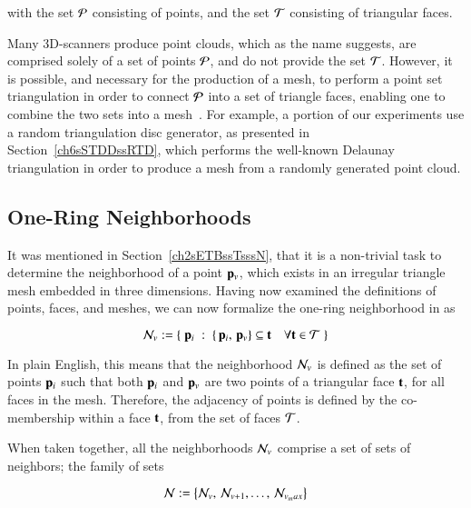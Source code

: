 with the set $\mathcal{P}$ consisting of points, and the set $\mathcal{T}$ consisting of triangular faces.

Many 3D-scanners produce point clouds, which as the name suggests, are comprised solely of a set of points $\mathcal{P}$, and do not provide the set $\mathcal{T}$. However, it is possible, and necessary for the production of a mesh, to perform a point set triangulation in order to connect $\mathcal{P}$ into a set of triangle faces, enabling one to combine the two sets into a mesh~\cite[p.~26]{Mara12}. For example, a portion of our experiments use a random triangulation disc generator, as presented in Section~\ref{ch6sSTDDssRTD}, which performs the well-known Delaunay triangulation in order to produce a mesh from a randomly generated point cloud.

%
%
%
%
\subsection{One-Ring Neighborhoods}
\label{ch2sTDDssORN}
It was mentioned in Section~\ref{ch2sETBssTsssN}, that it is a non-trivial task to determine the neighborhood of a point $\mathbf{p}_v$, which exists in an irregular triangle mesh embedded in three dimensions. Having now examined the definitions of points, faces, and meshes, we can now formalize the one-ring neighborhood in \tdd{} as

\begin{equation}
	\mathcal{N}_v := \left \{\;\mathbf{p}_i\;:\;\left \{\,\mathbf{p}_i,\,\mathbf{p}_v\right \} \subseteq \mathbf{t} \quad \forall \mathbf{t} \in \mathcal{T}\;\right \}
	\label{eq:defineNeighborhood}
\end{equation}%
%
%

In plain English, this means that the neighborhood $\mathcal{N}_v$ is defined as the set of points $\mathbf{p}_i$ such that both $\mathbf{p}_i$ and $\mathbf{p}_v$ are two points of a triangular face $\mathbf{t}$, for all faces in the mesh. Therefore, the adjacency of points is defined by the co-membership within a face $\mathbf{t}$, from the set of faces $\mathcal{T}$.

When taken together, all the neighborhoods $\mathcal{N}_v$ comprise a set of sets of neighbors; the family of sets

\begin{equation}
	\mathcal{N} := \left \{\mathcal{N}_v,\,\mathcal{N}_{v+1},\ldots,\,\mathcal{N}_{v_max}\right \}
	\label{eq:defineNeighborhood}
\end{equation}%
%

